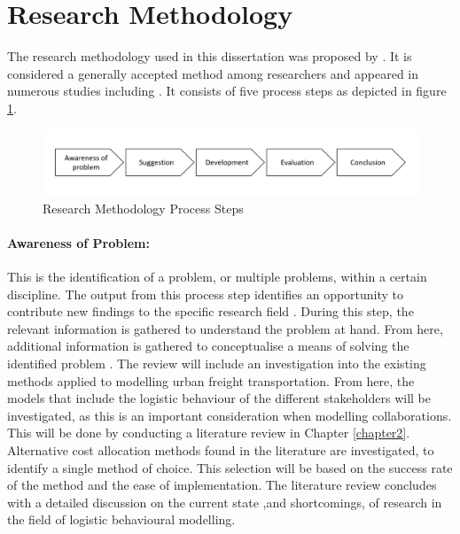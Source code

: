 
\section{Research Methodology}
The research methodology used in this dissertation was proposed by \citet{vaishnavi2004design}. It is considered a generally accepted method among researchers and appeared in numerous studies including \citet{bean2020behavioural,alfrijat2009a}. It consists of five process steps as depicted in figure \ref{fig:method_steps}.

\begin{figure}[ht]
    \centering
    \includegraphics[width=1\textwidth]{images/Method_steps.PNG}
    \caption{Research Methodology Process Steps}
    \label{fig:method_steps}
\end{figure}

\paragraph{Awareness of Problem:} This is the identification of a problem, or multiple problems, within a certain discipline. The output from this process step identifies an opportunity to contribute new findings to the specific research field \citep{vaishnavi2004design}. During this step, the relevant information is gathered to understand the problem at hand. From here, additional information is gathered to conceptualise a means of solving the identified problem \citep{alfrijat2009a}.
The review will include an investigation into the existing methods applied to modelling urban freight transportation. From here, the models that include the logistic behaviour of the different stakeholders will be investigated, as this is an important consideration when modelling collaborations. This will be done by conducting a literature review in Chapter \ref{chapter2}. Alternative cost allocation methods found in the literature are investigated, to identify a single method of choice. This selection will be based on the success rate of the method and the ease of implementation. The literature review concludes with a detailed discussion on the current state ,and shortcomings, of research in the field of logistic behavioural modelling.  \par

